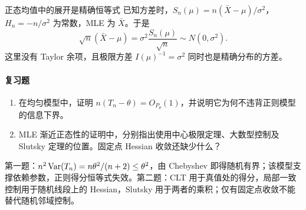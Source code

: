 \begin{examplebox}{正态均值中的展开是精确恒等式}
已知方差时，$S_n(\mu)=n(\bar X-\mu)/\sigma^2$，$H_n=-n/\sigma^2$ 为常数，MLE 为 $\bar X$。于是
\[
 \sqrt n(\bar X-\mu)
 =\sigma^2\frac{S_n(\mu)}{\sqrt n}
 \sim N(0,\sigma^2).
\]
这里没有 Taylor 余项，且极限方差 $I(\mu)^{-1}=\sigma^2$ 同时也是精确分布的方差。
\end{examplebox}

\paragraph{复习题}
\begin{enumerate}
 \item 在均匀模型中，证明 $n(T_n-\theta)=O_{P_\theta}(1)$，并说明它为何不违背正则模型的信息下界。
 \item MLE 渐近正态性的证明中，分别指出使用中心极限定理、大数型控制及 Slutsky 定理的位置。固定点 Hessian 收敛还缺少什么？
\end{enumerate}
\begin{notebox}[答案线索]
第一题：$n^2\operatorname{Var}(T_n)=n\theta^2/(n+2)\le\theta^2$，由 Chebyshev 即得随机有界；该模型支撑依赖参数，正则得分恒等式失效。第二题：CLT 用于真值处的得分，局部一致控制用于随机线段上的 Hessian，Slutsky 用于两者的乘积；仅有固定点收敛不能替代随机邻域控制。
\end{notebox}
